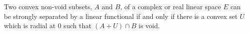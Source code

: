 Two convex non-void subsets, $A$ and $B$, of a complex or real linear space $E$ can be strongly separated by a linear functional if and only if there is a convex set $U$ which is radial at $0$ such that $(A + U) \cap B$ is void.
